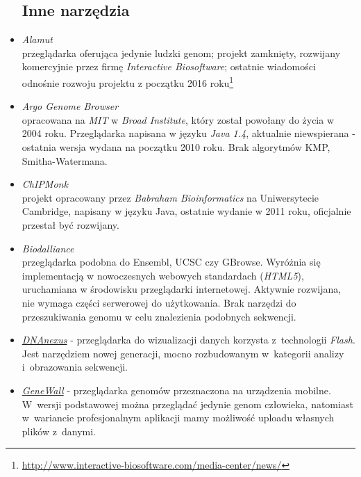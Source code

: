 \begin{itemize}
\subsection*{Inne narzędzia}	
	\item \emph{Alamut} \label{alamut} \\
	przeglądarka oferująca jedynie ludzki genom;
	projekt zamknięty, rozwijany komercyjnie przez firmę \textit{Interactive Biosoftware}; 
	ostatnie wiadomości odnośnie rozwoju projektu z początku 2016 roku\footnote{\url{http://www.interactive-biosoftware.com/media-center/news/}}
	
	\item \emph{Argo Genome Browser} \label{argo-genome-browser} \\
	opracowana na \textit{MIT} w \textit{Broad Institute}, który został powołany do życia w 2004 roku. 
	Przeglądarka napisana w języku \textit{Java 1.4}, aktualnie niewspierana - ostatnia wersja wydana na początku 2010 roku. Brak algorytmów KMP, Smitha-Watermana.
	
	\item \emph{ChIPMonk}\\
	projekt opracowany przez \textit{Babraham Bioinformatics} na Uniwersytecie Cambridge, napisany w języku Java, ostatnie wydanie w 2011 roku, oficjalnie przestał być rozwijany.
		
	\item \emph{Biodalliance}\\
	przeglądarka podobna do Ensembl, UCSC czy GBrowse. 
	Wyróżnia się implementacją w nowoczesnych webowych standardach (\textit{HTML5}), uruchamiana w środowisku przeglądarki internetowej. 
	Aktywnie rozwijana, nie wymaga części serwerowej do użytkowania. 
	Brak narzędzi do przeszukiwania genomu w celu znalezienia podobnych sekwencji.
	
	\item \href{https://www.dnanexus.com/genomes/hg18/public_browse}{\emph{DNAnexus}} \label{dnanexus} - przeglądarka do wizualizacji danych korzysta z~technologii \emph{Flash}. Jest narzędziem nowej generacji, mocno rozbudowanym w~kategorii analizy i~obrazowania sekwencji.
	
	\item \href{http://download.cnet.com/GeneWall-Genome-Browser-Pro/3000-2129_4-75855506.html}{\emph{GeneWall}} \label{genewall} - przeglądarka genomów przeznaczona na urządzenia mobilne. W~wersji podstawowej można przeglądać jedynie genom człowieka, natomiast w~wariancie profesjonalnym aplikacji mamy możliwość uploadu własnych plików z~danymi.
	

\end{itemize}
